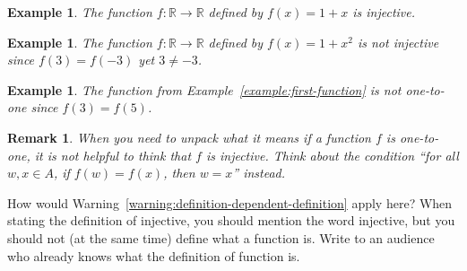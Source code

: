 \documentclass{book}
\newcounter{ekcounter}%
\theoremstyle{ekimcustom}
\newtheorem{example}[ekcounter]{Example}
\newtheorem{remark}[ekcounter]{Remark}
\begin{document}
\begin{example}
The function $f : \mathbb{R} \to \mathbb{R}$ defined by $f(x) = 1 + x$ is injective.
\end{example}
\begin{example}
The function $f : \mathbb{R} \to \mathbb{R}$ defined by $f(x) = 1 + x^2$ is not injective since $f(3)=f(-3)$ yet $3 \not= -3$.
\end{example}
\begin{example}
The function from Example~\ref{example:first-function} is not one-to-one since $f(3)=f(5)$.
\end{example}






\begin{remark}
When you need to unpack what it means if a function $f$ is one-to-one, it is not helpful to think that $f$ is injective. Think about the condition ``for all $w, x \in A$, if $f(w)=f(x)$, then $w=x$'' instead.
\end{remark}

How would Warning~\ref{warning:definition-dependent-definition} apply here? When stating the definition of injective, you should mention the word injective, but you should not (at the same time) define what a function is. Write to an audience who already knows what the definition of function is.
\end{document}
